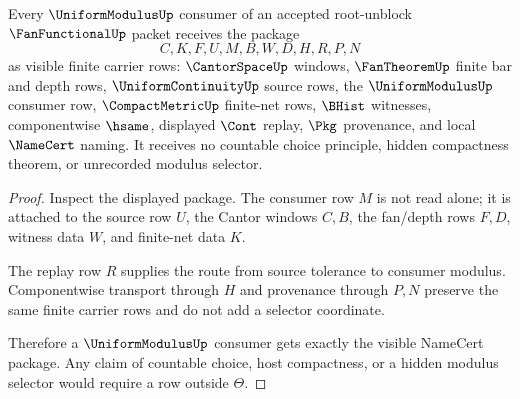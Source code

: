 \begin{theorem}
\label{thm:fanfunctional-uniformmodulus-consumer-package}
Every $\UniformModulusUp$ consumer of an accepted root-unblock $\FanFunctionalUp$ packet receives the package
$$
C,K,F,U,M,B,W,D,H,R,P,N
$$
as visible finite carrier rows: $\CantorSpaceUp$ windows, $\FanTheoremUp$ finite bar and depth rows, $\UniformContinuityUp$ source rows, the $\UniformModulusUp$ consumer row, $\CompactMetricUp$ finite-net rows, $\BHist$ witnesses, componentwise $\hsame$, displayed $\Cont$ replay, $\Pkg$ provenance, and local $\NameCert$ naming. It receives no countable choice principle, hidden compactness theorem, or unrecorded modulus selector.
\end{theorem}
\begin{proof}
Inspect the displayed package. The consumer row $M$ is not read alone; it is attached to the source row $U$, the Cantor windows $C,B$, the fan/depth rows $F,D$, witness data $W$, and finite-net data $K$.

The replay row $R$ supplies the route from source tolerance to consumer modulus. Componentwise transport through $H$ and provenance through $P,N$ preserve the same finite carrier rows and do not add a selector coordinate.

Therefore a $\UniformModulusUp$ consumer gets exactly the visible NameCert package. Any claim of countable choice, host compactness, or a hidden modulus selector would require a row outside $\Theta$.
\end{proof}

